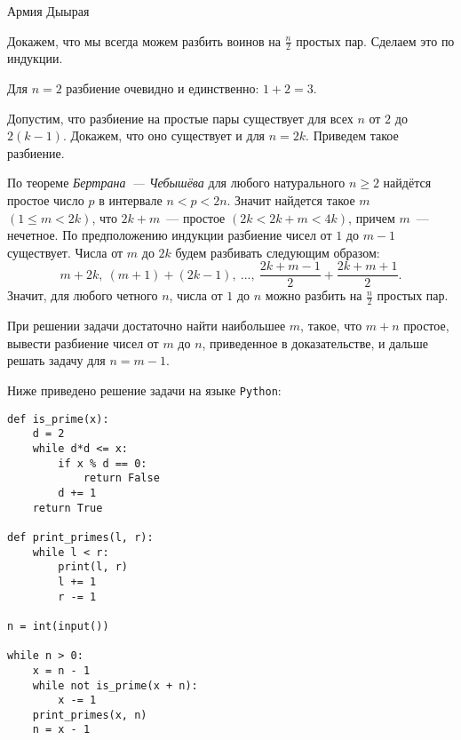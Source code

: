 \begin{tutorial}{Армия Дыырая}

Докажем, что мы всегда можем разбить воинов на $\displaystyle \frac{n}{2}$ простых пар. Сделаем это по индукции.

Для $n = 2$ разбиение очевидно и единственно: $1 + 2 = 3$.

Допустим, что разбиение на простые пары существует для всех $n$ от $2$ до $2(k-1)$. Докажем,  что оно существует и для $n=2k$. Приведем такое разбиение.

По теореме \textit{Бертрана~--- Чебышёва} для любого натурального $n \ge 2$ найдётся простое число $p$ в интервале $n < p < 2n$. Значит найдется такое $m$ $(1 \le m < 2k)$, что $2k + m$~--- простое $(2k < 2k + m < 4k)$, причем $m$~--- нечетное. По предположению индукции разбиение чисел от $1$ до $m-1$ существует. Числа от $m$ до $2k$ будем разбивать следующим образом: 
$$m + 2k,~(m+1) + (2k-1),~...,~\frac{2k + m-1}{2} + \frac{2k + m+1}{2}.$$
Значит, для любого четного $n$, числа от $1$ до $n$ можно разбить на $\displaystyle \frac{n}{2}$ простых пар.

При решении задачи достаточно найти наибольшее $m$, такое, что $m + n$ простое, вывести разбиение чисел от $m$ до $n$, приведенное в доказательстве, и дальше решать задачу для $n = m-1$.

Ниже приведено решение задачи на языке \texttt{Python}:
{\small
\begin{verbatim}
def is_prime(x):
    d = 2
    while d*d <= x:
        if x % d == 0:
            return False
        d += 1
    return True

def print_primes(l, r):
    while l < r:
        print(l, r)
        l += 1
        r -= 1

n = int(input())

while n > 0:
    x = n - 1
    while not is_prime(x + n):
        x -= 1
    print_primes(x, n)
    n = x - 1
\end{verbatim}
}

\end{tutorial}
